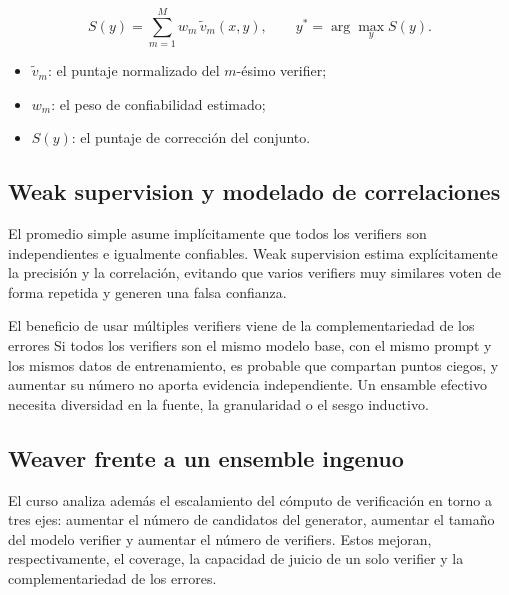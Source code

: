 \documentclass[a4paper]{article}
\begin{document}
$$
S(y)=\sum_{m=1}^{M} w_m\,\tilde v_m(x,y),
\qquad
 y^*=\arg\max_y S(y).
$$

\begin{itemize}
    \item $\tilde v_m$: el puntaje normalizado del $m$-ésimo verifier;
    \item $w_m$: el peso de confiabilidad estimado;
    \item $S(y)$: el puntaje de corrección del conjunto.
\end{itemize}

\subsection{Weak supervision y modelado de correlaciones}

El promedio simple asume implícitamente que todos los verifiers son independientes e igualmente confiables. Weak supervision estima explícitamente la precisión y la correlación, evitando que varios verifiers muy similares voten de forma repetida y generen una falsa confianza.


\begin{importantbox}{El beneficio de usar múltiples verifiers viene de la complementariedad de los errores}
Si todos los verifiers son el mismo modelo base, con el mismo prompt y los mismos datos de entrenamiento, es probable que compartan puntos ciegos, y aumentar su número no aporta evidencia independiente. Un ensamble efectivo necesita diversidad en la fuente, la granularidad o el sesgo inductivo.
\end{importantbox}

\subsection{Weaver frente a un ensemble ingenuo}


El curso analiza además el escalamiento del cómputo de verificación en torno a tres ejes: aumentar el número de candidatos del generator, aumentar el tamaño del modelo verifier y aumentar el número de verifiers. Estos mejoran, respectivamente, el coverage, la capacidad de juicio de un solo verifier y la complementariedad de los errores.
\end{document}
